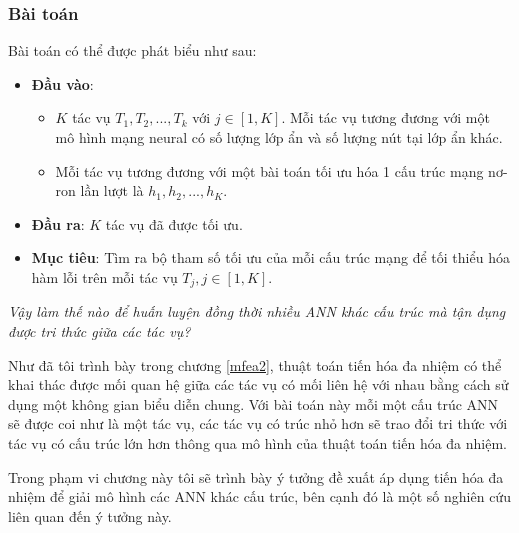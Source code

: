 \subsubsection{Bài toán}
Bài toán có thể được phát biểu như sau:
\begin{itemize}
    \item \textbf{Đầu vào}: 
    \begin{itemize}
        \item $K$ tác vụ $T_1, T_2, ... ,T_k$ với $j \in [1,K]$. Mỗi tác vụ tương đương với một mô hình mạng neural có số lượng lớp ẩn và số lượng nút tại lớp ẩn khác.
        \item Mỗi tác vụ tương đương với một bài toán tối ưu hóa 1 cấu trúc mạng nơ-ron lần lượt là $h_1, h_2, ... , h_K$.
    \end{itemize}
    \item \textbf{Đầu ra}: $K$ tác vụ đã được tối ưu.
    \item \textbf{Mục tiêu}: Tìm ra bộ tham số tối ưu của mỗi cấu trúc mạng để tối thiểu hóa hàm lỗi trên mỗi tác vụ $T_j, j \in [1,K]$. 
\end{itemize}

\textit{Vậy làm thế nào để huấn luyện đồng thời nhiều ANN khác cấu trúc mà tận dụng được tri thức giữa các tác vụ?}
 
Như đã tôi trình bày trong chương \ref{mfea2}, thuật toán tiến hóa đa nhiệm có thể khai thác được mối quan hệ giữa các tác vụ có mối liên hệ với nhau bằng cách sử dụng một không gian biểu diễn chung. Với bài toán này mỗi một cấu trúc ANN sẽ được coi như là một tác vụ, các tác vụ có trúc nhỏ hơn sẽ trao đổi tri thức với tác vụ có cấu trúc lớn hơn thông qua mô hình của thuật toán tiến hóa đa nhiệm. 

Trong phạm vi chương này tôi sẽ trình bày ý tưởng đề xuất áp dụng tiến hóa đa nhiệm để giải mô hình các ANN khác cấu trúc, bên cạnh đó là một số nghiên cứu liên quan đến ý tưởng này.


